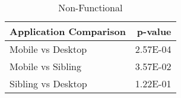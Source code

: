 \begin{table}[ht]
\centering
\caption{Non-Functional} 
\begin{tabular}{lr}
  \hline
Application Comparison & p-value \\ 
  \hline
Mobile vs Desktop & 2.57E-04 \\ 
  Mobile vs Sibling & 3.57E-02 \\ 
  Sibling vs Desktop & 1.22E-01 \\ 
   \hline
\end{tabular}
\end{table}
